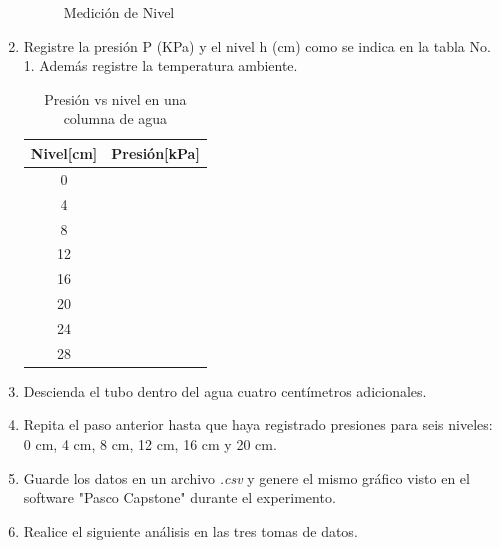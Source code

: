 \documentclass[12pt,letterpaper]{report}
\begin{document}
\begin{enumerate}
\begin{figure} [!ht]
        \caption{Medición de Nivel}
        \label{fig:altura}
    \end{figure}
    \item Registre la presión P (KPa) y el nivel h (cm) como se indica en la tabla No. 1. Además registre la temperatura ambiente. 
    \begin{table}[!ht]
        \centering
        \begin{tabular}{c|c}
            \textbf{Nivel[cm]} & \textbf{Presión[kPa]} \\
            \hline
             0 & \\
             4 & \\
             8 & \\
             12 & \\
             16 & \\
             20 & \\
             24 & \\
             28 & \\
        \end{tabular}
        \caption{Presión vs nivel en una columna de agua}
        \label{tab:my_label}
    \end{table}
    \item Descienda el tubo dentro del agua cuatro centímetros adicionales.
    \item Repita el paso anterior hasta que haya registrado presiones para seis niveles: 0 cm, 4 cm, 8 cm, 12 cm, 16 cm y 20 cm.
    \item Guarde los datos en un archivo \emph{.csv} y genere el mismo gráfico visto en el software "Pasco Capstone" durante el experimento.
    \item Realice el siguiente análisis en las tres tomas de datos.
\end{enumerate}
\end{document}
